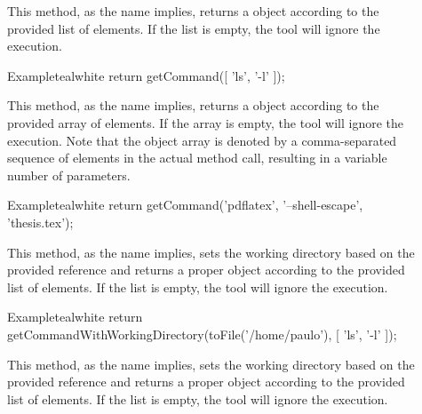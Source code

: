\begin{description}
\item[] This method, as the name implies, returns a  object according to the provided list of  elements. If the list is empty, the tool will ignore the execution.

\begin{codebox}{Example}{teal}{\icnote}{white}
return getCommand([ 'ls', '-l' ]);
\end{codebox}

\item[] This method, as the name implies, returns a  object according to the provided array of  elements. If the array is empty, the tool will ignore the execution. Note that the object array is denoted by a comma-separated sequence of elements in the actual method call, resulting in a variable number of parameters.

\begin{codebox}{Example}{teal}{\icnote}{white}
return getCommand('pdflatex', '--shell-escape', 'thesis.tex');
\end{codebox}

\item[] This method, as the name implies, sets the working directory based on the provided  reference and returns a proper  object according to the provided list of  elements. If the list is empty, the tool will ignore the execution.

\begin{codebox}{Example}{teal}{\icnote}{white}
return getCommandWithWorkingDirectory(toFile('/home/paulo'),
       [ 'ls', '-l' ]);
\end{codebox}

\item[] This method, as the name implies, sets the working directory based on the provided  reference and returns a proper  object according to the provided list of  elements. If the list is empty, the tool will ignore the execution.


\end{description}
